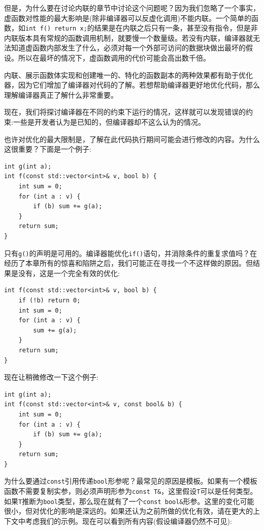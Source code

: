 但是，为什么要在讨论内联的章节中讨论这个问题呢？因为我们忽略了一个事实，虚函数对性能的最大影响是(除非编译器可以反虚化调用)不能内联。一个简单的函数，如\texttt{int f() {return x;}}的结果是在内联之后只有一条，甚至没有指令，但是非内联版本具有常规的函数调用机制，就要慢一个数量级。若没有内联，编译器就无法知道虚函数内部发生了什么，必须对每一个外部可访问的数据块做出最坏的假设。所以在最坏的情况下，虚函数调用的代价可能会高出数千倍。

内联、展示函数体实现和创建唯一的、特化的函数副本的两种效果都有助于优化器，因为它们增加了编译器对代码的了解。若想帮助编译器更好地优化代码，那么理解编译器真正了解什么非常重要。 

现在，我们将探讨编译器在不同的约束下运行的情况，这样就可以发现错误的约束:一些是开发者认为是已知的，但编译器却不这么认为的情况。 


也许对优化的最大限制是，了解在此代码执行期间可能会进行修改的内容。为什么这很重要？下面是一个例子:

\begin{lstlisting}[style=styleCXX]
int g(int a);
int f(const std::vector<int>& v, bool b) {
	int sum = 0;
	for (int a : v) {
		if (b) sum += g(a);
	}
	return sum;
} 
\end{lstlisting}

只有\texttt{g()}的声明是可用的。编译器能优化\texttt{if()}语句，并消除条件的重复求值吗？在经历了本章所有的惊喜和陷阱之后，我们可能正在寻找一个不这样做的原因。但结果是没有，这是一个完全有效的优化:

\begin{lstlisting}[style=styleCXX]
int f(const std::vector<int>& v, bool b) {
	if (!b) return 0;
	int sum = 0;
	for (int a : v) {
		sum += g(a);
	}
	return sum;
} 

\end{lstlisting}

现在让稍微修改一下这个例子:

\begin{lstlisting}[style=styleCXX]
int g(int a);
int f(const std::vector<int>& v, const bool& b) {
	int sum = 0;
	for (int a : v) {
		if (b) sum += g(a);
	}
	return sum;
} 
\end{lstlisting}

为什么要通过\texttt{const}引用传递\texttt{bool}形参呢？最常见的原因是模板。如果有一个模板函数不需要复制实参，则必须声明形参为\texttt{const T\&}，这里假设\texttt{T}可以是任何类型。如果\texttt{T}推断为\texttt{bool}类型，那么现在就有了一个\texttt{const bool\&}形参。这里的变化可能很小，但对优化的影响是深远的。如果还认为之前所做的优化有效，请在更大的上下文中考虑我们的示例。现在可以看到所有内容(假设编译器仍然不可见):

